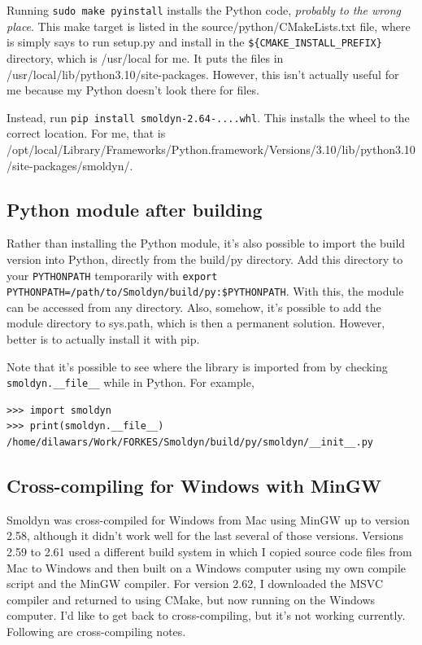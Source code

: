 \documentclass {scrbook}
\newcommand {\ttt} {\texttt}
\begin{document}
Running \ttt{sudo make pyinstall} installs the Python code, \textit{probably to the wrong place}. This make target is listed in the source/python/CMakeLists.txt file, where is simply says to run setup.py and install in the \ttt{\$\{CMAKE\_INSTALL\_PREFIX\}} directory, which is /usr/local for me. It puts the files in /usr/local/lib/python3.10/site-packages. However, this isn't actually useful for me because my Python doesn't look there for files.

Instead, run \ttt{pip install smoldyn-2.64-....whl}. This installs the wheel to the correct location. For me, that is /opt/local/Library/Frameworks/Python.framework/Versions/3.10/lib/\allowbreak python3.10/\allowbreak site-packages/\allowbreak smoldyn/.


\subsection{Python module after building}

Rather than installing the Python module, it's also possible to import the build version into Python, directly from the build/py directory. Add this directory to your \ttt{PYTHONPATH} temporarily with \ttt{export PYTHONPATH=/path/to/Smoldyn/build/py:\$PYTHONPATH}. With this, the module can be accessed from any directory. Also, somehow, it's possible to add the module directory to sys.path, which is then a permanent solution. However, better is to actually install it with pip.

Note that it's possible to see where the library is imported from by checking
\verb|smoldyn.__file__| while in Python. For example, 

\begin{verbatim}
>>> import smoldyn
>>> print(smoldyn.__file__)
/home/dilawars/Work/FORKES/Smoldyn/build/py/smoldyn/__init__.py
\end{verbatim}


\subsection{Cross-compiling for Windows with MinGW}

Smoldyn was cross-compiled for Windows from Mac using MinGW up to version 2.58, although it didn't work well for the last several of those versions. Versions 2.59 to 2.61 used a different build system in which I copied source code files from Mac to Windows and then built on a Windows computer using my own compile script and the MinGW compiler. For version 2.62, I downloaded the MSVC compiler and returned to using CMake, but now running on the Windows computer. I'd like to get back to cross-compiling, but it's not working currently. Following are cross-compiling notes.
\end{document}
